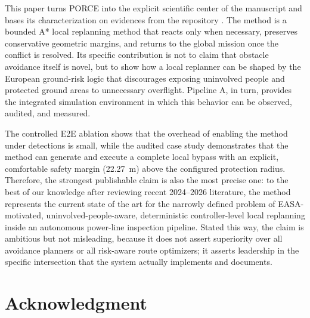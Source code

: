 \documentclass[journal,twoside,web]{ieeecolor}
\begin{document}
This paper turns PORCE into the explicit scientific center of the manuscript and bases its characterization on evidences from the repository \cite{Deep_Aero_Twin}. The method is a bounded A* local replanning method that reacts only when necessary, preserves conservative geometric margins, and returns to the global mission once the conflict is resolved. Its specific contribution is not to claim that obstacle avoidance itself is novel, but to show how a local replanner can be shaped by the European ground-risk logic that discourages exposing uninvolved people and protected ground areas to unnecessary overflight. Pipeline A, in turn, provides the integrated simulation environment in which this behavior can be observed, audited, and measured.

The controlled E2E ablation shows that the overhead of enabling the method under detections is small, while the audited case study demonstrates that the method can generate and execute a complete local bypass with an explicit, comfortable safety margin (\SI{22.27}{\meter}) above the configured protection radius. Therefore, the strongest publishable claim is also the most precise one: to the best of our knowledge after reviewing recent 2024--2026 literature, the method represents the current state of the art for the narrowly defined problem of EASA-motivated, uninvolved-people-aware, deterministic controller-level local replanning inside an autonomous power-line inspection pipeline. Stated this way, the claim is ambitious but not misleading, because it does not assert superiority over all avoidance planners or all risk-aware route optimizers; it asserts leadership in the specific intersection that the system actually implements and documents.


\section*{Acknowledgment}



\end{document}

